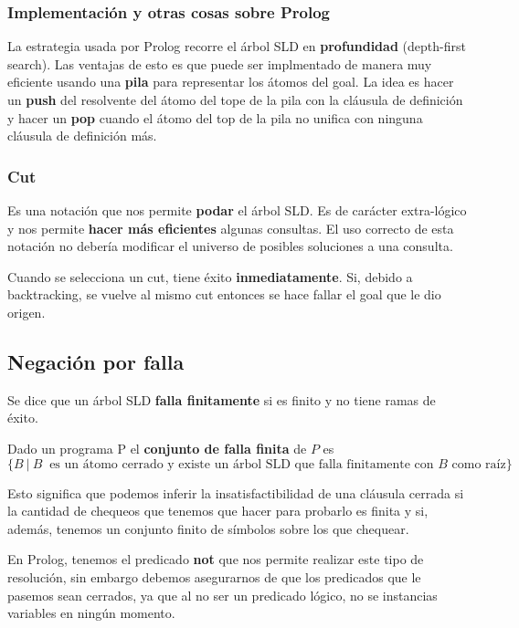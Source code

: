 \subsubsection{Implementación y otras cosas sobre Prolog}
La estrategia usada por Prolog recorre el árbol SLD en \textbf{profundidad} (depth-first search). Las ventajas de esto es que puede ser implmentado de manera muy eficiente usando una \textbf{pila} para representar los átomos del goal.
La idea es hacer un \textbf{push} del resolvente del átomo del tope de la pila con la cláusula de definición y hacer un \textbf{pop} cuando el átomo del top de la pila no unifica con ninguna cláusula de definición más.

\subsubsection*{Cut}
Es una notación que nos permite \textbf{podar} el árbol SLD. Es de carácter extra-lógico y nos permite \textbf{hacer más eficientes} algunas consultas. El uso correcto de esta notación no debería modificar el universo de posibles soluciones a una consulta.

Cuando se selecciona un cut, tiene éxito \textbf{inmediatamente}. Si, debido a backtracking, se vuelve al mismo cut entonces se hace fallar el goal que le dio origen.

\subsection*{Negación por falla}
Se dice que un árbol SLD \textbf{falla finitamente} si es finito y no tiene ramas de éxito.

Dado un programa P el \textbf{conjunto de falla finita} de $P$ es $$\{ B ~|~B~ \text{ es un átomo cerrado y existe un árbol SLD que falla finitamente con } B \text{ como raíz}\} $$ 

Esto significa que podemos inferir la insatisfactibilidad de una cláusula cerrada si la cantidad de chequeos que tenemos que hacer para probarlo es finita y si, además, tenemos un conjunto finito de símbolos sobre los que chequear.

En Prolog, tenemos el predicado \textbf{not} que nos permite realizar este tipo de resolución, sin embargo debemos asegurarnos de que los predicados que le pasemos sean cerrados, ya que al no ser un predicado lógico, no se instancias variables en ningún momento.